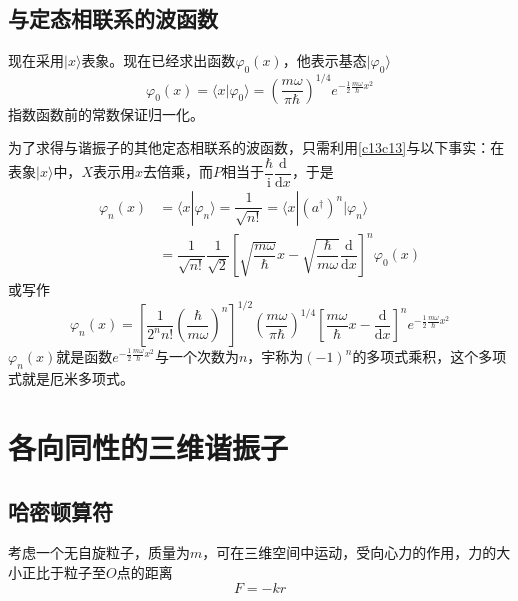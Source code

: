 \documentclass[]{article}
\begin{document}
\subsection{与定态相联系的波函数}
现在采用${|x\rangle}$表象。现在已经求出函数$\varphi_0(x)$，他表示基态$|\varphi_0\rangle$
\begin{equation}
	\varphi_0(x)=\langle x|\varphi_0\rangle=\left( \dfrac{m\omega}{\pi\hbar}\right) ^{1/4}e^{-\frac{1}{2}\frac{m\omega}{\hbar}x^2}
\end{equation}
指数函数前的常数保证归一化。\par 
为了求得与谐振子的其他定态相联系的波函数，只需利用\eqref{c13c13}与以下事实：在表象${|x\rangle}$中，$X$表示用$x$去倍乘，而$P$相当于$\dfrac{\hbar}{\mathrm{i}}\dfrac{\mathrm{d}}{\mathrm{d}x}$，于是
\begin{align}
	\varphi_n(x)&=\langle x|\varphi_n\rangle=\dfrac{1}{\sqrt{n!}}=\langle x|(a^\dagger)^n|\varphi_n\rangle\nonumber\\
	&=\dfrac{1}{\sqrt{n!}}\dfrac{1}{\sqrt{2}}\left[ \sqrt{\dfrac{m\omega}{\hbar}}x-\sqrt{\dfrac{\hbar}{m\omega}}\dfrac{\mathrm{d}}{\mathrm{d}x}\right] ^n\varphi_0(x)
\end{align}
或写作
\begin{equation}
	\varphi_n(x)=\left[ \dfrac{1}{2^nn!}\left( \dfrac{\hbar}{m\omega}\right) ^n\right] ^{1/2}\left( \dfrac{m\omega}{\pi\hbar}\right) ^{1/4}\left[ \dfrac{m\omega}{\hbar}x-\dfrac{\mathrm{d}}{\mathrm{d}x}\right] ^ne^{-\frac{1}{2}\frac{m\omega}{\hbar}x^2}
\end{equation}
$\varphi_n(x)$就是函数$e^{-\frac{1}{2}\frac{m\omega}{\hbar}x^2}$与一个次数为$n$，宇称为$(-1)^n$的多项式乘积，这个多项式就是厄米多项式。
\section{各向同性的三维谐振子}
\subsection{哈密顿算符}
考虑一个无自旋粒子，质量为$m$，可在三维空间中运动，受向心力的作用，力的大小正比于粒子至$O$点的距离
\begin{equation}
	F=-kr
\end{equation}
\end{document}
